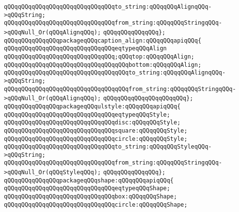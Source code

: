\verb|qQQqqQQqqQQqqQQqqQQqqQQqqQQqqQQqto_string:qQQqqQQqAlignqQQq->qQQqString;|\newline
\verb|qQQqqQQqqQQqqQQqqQQqqQQqqQQqqQQqfrom_string:qQQqqQQqStringqQQq->qQQqNull_Or(qQQqAlignqQQq);|\newline
\verb|qQQqqQQqqQQqqQQq};|\newline
\newline
\verb|qQQqqQQqqQQqqQQqpackageqQQqcaption_align:qQQqqQQqapiqQQq{|\newline
\verb|qQQqqQQqqQQqqQQqqQQqqQQqqQQqqQQqeqtypeqQQqAlign|\newline
\verb|qQQqqQQqqQQqqQQqqQQqqQQqqQQqqQQq;qQQqtop:qQQqqQQqAlign;|\newline
\verb|qQQqqQQqqQQqqQQqqQQqqQQqqQQqqQQqqQQqbottom:qQQqqQQqAlign;|\newline
\verb|qQQqqQQqqQQqqQQqqQQqqQQqqQQqqQQqqQQqto_string:qQQqqQQqAlignqQQq->qQQqString;|\newline
\verb|qQQqqQQqqQQqqQQqqQQqqQQqqQQqqQQqqQQqfrom_string:qQQqqQQqStringqQQq->qQQqNull_Or(qQQqAlignqQQq);|\newline
\verb|qQQqqQQqqQQqqQQqqQQqqQQq};|\newline
\newline
\verb|qQQqqQQqqQQqqQQqpackageqQQqulstyle:qQQqqQQqapiqQQq{|\newline
\verb|qQQqqQQqqQQqqQQqqQQqqQQqqQQqqQQqeqtypeqQQqStyle;|\newline
\verb|qQQqqQQqqQQqqQQqqQQqqQQqqQQqqQQqdisc:qQQqqQQqStyle;|\newline
\verb|qQQqqQQqqQQqqQQqqQQqqQQqqQQqqQQqsquare:qQQqqQQqStyle;|\newline
\verb|qQQqqQQqqQQqqQQqqQQqqQQqqQQqqQQqcircle:qQQqqQQqStyle;|\newline
\verb|qQQqqQQqqQQqqQQqqQQqqQQqqQQqqQQqto_string:qQQqqQQqStyleqQQq->qQQqString;|\newline
\verb|qQQqqQQqqQQqqQQqqQQqqQQqqQQqqQQqfrom_string:qQQqqQQqStringqQQq->qQQqNull_Or(qQQqStyleqQQq);|\newline
\verb|qQQqqQQqqQQqqQQq};|\newline
\newline
\verb|qQQqqQQqqQQqqQQqpackageqQQqshape:qQQqqQQqapiqQQq{|\newline
\verb|qQQqqQQqqQQqqQQqqQQqqQQqqQQqqQQqeqtypeqQQqShape;|\newline
\verb|qQQqqQQqqQQqqQQqqQQqqQQqqQQqqQQqbox:qQQqqQQqShape;|\newline
\verb|qQQqqQQqqQQqqQQqqQQqqQQqqQQqqQQqcircle:qQQqqQQqShape;|\newline
